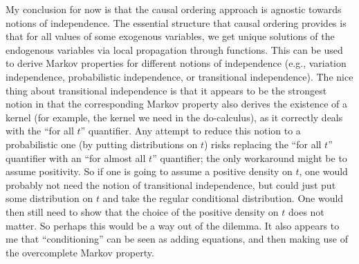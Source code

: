 My conclusion for now is that the causal ordering approach is agnostic towards notions of independence. 
The essential structure that causal ordering provides is that for all values of some exogenous variables, we get
unique solutions of the endogenous variables via local propagation through functions.
This can be used to derive Markov properties for different notions of independence (e.g., variation independence, probabilistic independence, or transitional independence).
The nice thing about transitional independence is that it appears to be the strongest notion in that the corresponding Markov property also derives the existence of a kernel (for example, the kernel we need in the do-calculus), as it correctly deals with the ``for all $t$'' quantifier. Any attempt to reduce this notion to a probabilistic one (by putting distributions on $t$) risks replacing the ``for all $t$'' quantifier with an ``for almost all $t$'' quantifier; the only workaround might be to assume positivity. 
So if one is going to assume a positive density on $t$, one would probably not need the notion of transitional independence, but could just put some distribution on $t$ and take the regular conditional distribution.
One would then still need to show that the choice of the positive density on $t$ does not matter.
So perhaps this would be a way out of the dilemma.
It also appears to me that ``conditioning'' can be seen as adding equations, and then making use of the overcomplete Markov property.


